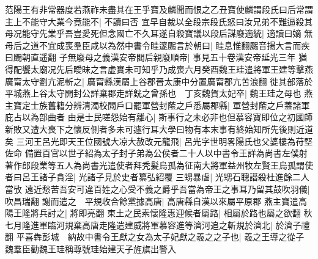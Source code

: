 范陽王有非常器度若燕祚未盡其在王乎寶及麟聞而恨之乙丑寶使麟謂段氏曰后常謂主上不能守大業今竟能不|{
	不讀曰否}
宜早自裁以全段宗段氏怒曰汝兄弟不難逼殺其母况能守先業乎吾豈愛死但念國亡不久耳遂自殺寶議以段后謀廢適統|{
	適讀曰嫡}
無母后之道不宜成喪羣臣咸以為然中書令眭邃颺言於朝曰|{
	眭息惟翻颺音揚大言而疾曰颺朝直遥翻}
子無廢母之義漢安帝閻后親廢順帝|{
	事見五十卷漢安帝延光三年}
猶得配饗太廟况先后曖昧之言虚實未可知乎乃成喪六月癸酉魏王珪遣將軍王建等擊燕廣甯太守劉亢泥斬之|{
	廣甯縣漢屬上谷郡晉太康中分置廣甯郡亢苦浪翻}
徙其部落於平城燕上谷太守開封公詳棄郡走詳皝之曾孫也　丁亥魏賀太妃卒|{
	魏王珪之母也}
燕主寶定士族舊籍分辨清濁校閲戶口罷軍營封䕃之戶悉屬郡縣|{
	軍營封䕃之戶蓋諸軍庇占以為部曲者}
由是士民嗟怨始有離心|{
	斯事行之未必非也但慕容寶即位之初國師新敗又遭大喪下之懷反側者多未可遽行耳大學曰物有本末事有終始知所先後則近道矣}
三河王呂光即天王位國號大凉大赦改元龍飛|{
	呂光字世明畧陽氏也父婆樓為苻堅佐命}
備置百官以世子紹為太子封子弟為公侯者二十人以中書令王詳為尚書左僕射著作郎段業等五人為尚書光遣使者拜秃髪烏孤為征南大將軍益州牧左賢王烏孤謂使者曰呂王諸子貪淫|{
	光諸子見於史者纂弘紹覆}
三甥暴虐|{
	光甥石聰譛殺杜進餘二人當攷}
遠近愁苦吾安可違百姓之心受不義之爵乎吾當為帝王之事耳乃留其鼓吹羽儀|{
	吹昌瑞翻}
謝而遣之　平規收合餘黨據高唐|{
	高唐縣自漢以來屬平原郡}
燕主寶遣高陽王隆將兵討之|{
	將即亮翻}
東土之民素懷隆惠迎候者屬路|{
	相屬於路也屬之欲翻}
秋七月隆進軍臨河規棄高唐走隆遣建威將軍慕容進等濟河追之斬規於濟北|{
	於濟子禮翻}
平喜犇彭城　納故中書令王獻之女為太子妃獻之羲之之子也|{
	羲之王導之從子}
魏羣臣勸魏王珪稱尊號珪始建天子旌旗出警入

